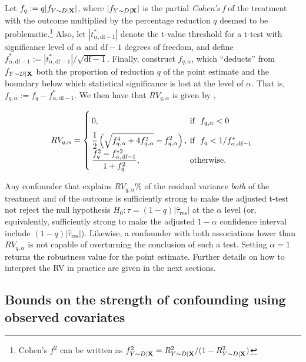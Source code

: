 \documentclass[
]{jss}
\begin{document}
Let \(f_q := q|f_{Y\sim D | {\bf X}}|\), where
\(|f_{Y\sim D | {\bf X}}|\) is the partial \emph{Cohen's f} of the
treatment with the outcome multiplied by the percentage reduction \(q\)
deemed to be
problematic.\footnote{Cohen's $f^2$ can be written as $f^2_{Y\sim D | {\bf X}} = R^2_{Y\sim D | {\bf X}}/(1-R^2_{Y\sim D | {\bf X}})$}
Also, let \(|t^*_{\alpha, \text{df}-1}|\) denote the t-value threshold
for a t-test with significance level of \(\alpha\) and \(\text{df}-1\)
degrees of freedom, and define
\(f^*_{\alpha, \text{df} - 1} := |t^*_{\alpha, \text{df}-1}|/\sqrt{\text{df} -1}\).
Finally, construct \(f_{q, \alpha}\), which ``deducts'' from
\(f_{Y\sim D | {\bf X}}\) both the proportion of reduction \(q\) of the
point estimate and the boundary below which statistical significance is
lost at the level of \(\alpha\). That is,
\(f_{q, \alpha} := f_q - f^*_{\alpha,\text{df} - 1}\). We then have that
\(RV_{q,\alpha}\) is given by \citep{cinelli:jrssb2019, cinelli:wp2020},

\noindent  \begin{align}
RV_{q, \alpha} =\left\{
\arraycolsep=2pt\def\arraystretch{2}
\begin{array}{ll}
\displaystyle 0, & \text{if}~~f_{q, \alpha} < 0 \\
\displaystyle \frac{1}{2}\left(\sqrt{f_{q, \alpha}^4 + 4f_{q, \alpha}^2} - f_{q, \alpha}^2\right), & \text{if}~~ f_{q} < 1/f^*_{\alpha, \text{df}-1}\\
\displaystyle \frac{f_{q}^2 - f^{*2}_{\alpha,\text{df} - 1}}{1+f^2_{q}}, & \text{otherwise}. 
\end{array}\right.
\label{eq:rvt_main}
\end{align}

\noindent Any confounder that explains \(RV_{q,\alpha}\%\) of the
residual variance \emph{both} of the treatment and of the outcome is
sufficiently strong to make the adjusted t-test not reject the null
hypothesis \(H_0: \tau = (1-q)|\hat{\tau}_{\text{res}}|\) at the
\(\alpha\) level (or, equivalently, sufficiently strong to make the
adjusted \(1-\alpha\) confidence interval include
\((1-q)|\hat{\tau}_{\text{res}}|\)). Likewise, a confounder with both
associations lower than \(RV_{q, \alpha}\) is not capable of overturning
the conclusion of such a test. Setting \(\alpha =1\) returns the
robustness value for the point estimate. Further details on how to
interpret the RV in practice are given in the next sections.

\hypertarget{bounds}{%
\subsection{Bounds on the strength of confounding using observed
covariates}\label{bounds}}
\end{document}
